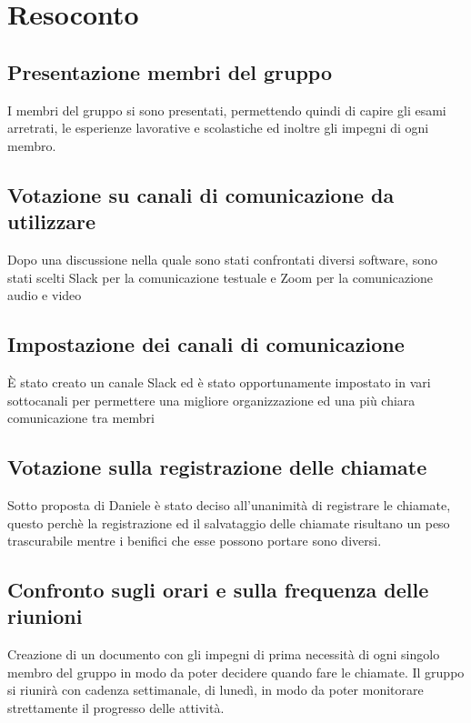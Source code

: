 \newpage

\section{Resoconto}

\subsection{Presentazione membri del gruppo}

I membri del gruppo si sono presentati, permettendo quindi di capire gli esami arretrati, le esperienze lavorative e scolastiche ed inoltre gli impegni di ogni membro.

\subsection{Votazione su canali di comunicazione da utilizzare}

Dopo una discussione nella quale sono stati confrontati diversi software, sono stati scelti Slack per la comunicazione testuale e Zoom per la comunicazione audio e video

\subsection{Impostazione dei canali di comunicazione}

È stato creato un canale Slack ed è stato opportunamente impostato in vari sottocanali per permettere una migliore organizzazione ed una più chiara comunicazione tra membri

\subsection{Votazione sulla registrazione delle chiamate}

Sotto proposta di Daniele è stato deciso all’unanimità di registrare le chiamate, questo perchè la registrazione ed il salvataggio delle chiamate risultano un peso trascurabile mentre i benifici che esse possono portare sono diversi.

\subsection{Confronto sugli orari e sulla frequenza delle riunioni}

Creazione di un documento con gli impegni di prima necessità di ogni singolo membro del gruppo in modo da poter decidere quando fare le chiamate. Il gruppo si riunirà con cadenza settimanale, di lunedì, in modo da poter monitorare strettamente il progresso delle attività.


